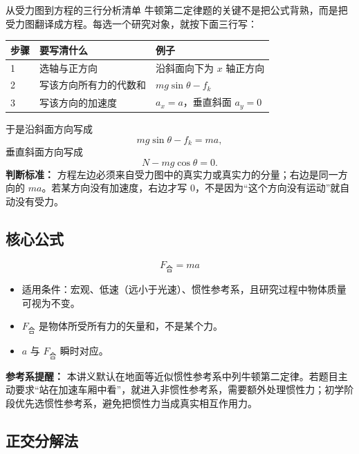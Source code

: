 \begin{learningbox}{从受力图到方程的三行分析清单}
牛顿第二定律题的关键不是把公式背熟，而是把受力图翻译成方程。每选一个研究对象，就按下面三行写：

\begin{center}
\begin{tabular}{lll}
\toprule
步骤 & 要写清什么 & 例子 \\
\midrule
1 & 选轴与正方向 & 沿斜面向下为 $x$ 轴正方向 \\
2 & 写该方向所有力的代数和 & $mg\sin\theta-f_k$ \\
3 & 写该方向的加速度 & $a_x=a$，垂直斜面 $a_y=0$ \\
\bottomrule
\end{tabular}
\end{center}

于是沿斜面方向写成
\[
mg\sin\theta-f_k=ma,
\]
垂直斜面方向写成
\[
N-mg\cos\theta=0.
\]
\textbf{判断标准：} 方程左边必须来自受力图中的真实力或真实力的分量；右边是同一方向的 $ma$。若某方向没有加速度，右边才写 $0$，不是因为“这个方向没有运动”就自动没有受力。
\end{learningbox}

\begin{center}


\label{fig:newton-axis-equation-example}
\end{center}

\subsection*{核心公式}

\[
\boxed{F_{\text{合}} = ma}
\]

\begin{itemize}
  \item 适用条件：宏观、低速（远小于光速）、惯性参考系，且研究过程中物体质量可视为不变。
  \item $F_{\text{合}}$ 是物体所受所有力的矢量和，不是某个力。
  \item $a$ 与 $F_{\text{合}}$ 瞬时对应。
\end{itemize}

\textbf{参考系提醒：} 本讲义默认在地面等近似惯性参考系中列牛顿第二定律。若题目主动要求“站在加速车厢中看”，就进入非惯性参考系，需要额外处理惯性力；初学阶段优先选惯性参考系，避免把惯性力当成真实相互作用力。

\subsection*{正交分解法}

